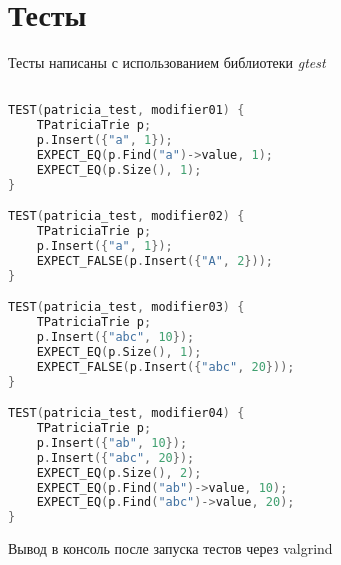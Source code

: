 \section{Тесты}

Тесты написаны с использованием библиотеки \textit{gtest} 

\begin{lstlisting}[language=C++]

TEST(patricia_test, modifier01) {
    TPatriciaTrie p;
    p.Insert({"a", 1});
    EXPECT_EQ(p.Find("a")->value, 1);
    EXPECT_EQ(p.Size(), 1);
}

TEST(patricia_test, modifier02) {
    TPatriciaTrie p;
    p.Insert({"a", 1});
    EXPECT_FALSE(p.Insert({"A", 2}));
}

TEST(patricia_test, modifier03) {
    TPatriciaTrie p;
    p.Insert({"abc", 10});
    EXPECT_EQ(p.Size(), 1);
    EXPECT_FALSE(p.Insert({"abc", 20}));
}

TEST(patricia_test, modifier04) {
    TPatriciaTrie p;
    p.Insert({"ab", 10});
    p.Insert({"abc", 20});
    EXPECT_EQ(p.Size(), 2);
    EXPECT_EQ(p.Find("ab")->value, 10);
    EXPECT_EQ(p.Find("abc")->value, 20);
}
\end{lstlisting}

Вывод в консоль после запуска тестов через valgrind


